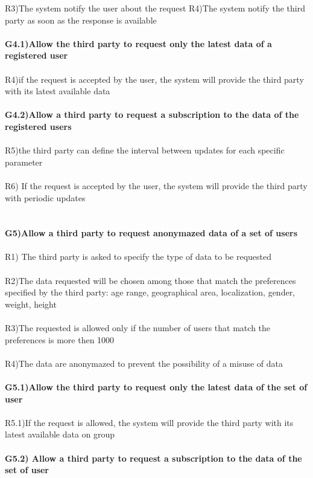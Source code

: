 R3)The system notify the user about the request 
R4)The system notify the third party as soon as the response is available \\ \\
\textbf{G4.1)Allow the third party to request only the latest data of a registered user} \\ \\
R4)if the request is accepted by the user, the system will provide the third party with its latest available data \\ \\ 
\textbf{G4.2)Allow a third party to request a subscription to the data of the registered users} \\ \\
R5)the third party can define the interval between updates for each specific parameter \\ \\
R6) If the request is accepted by the user, the system will provide the third party with periodic updates \\ \\ \\
\textbf{G5)Allow a third party to request anonymazed data of a set of users} \\ \\
R1) The third party is asked to specify the type of data to be requested \\ \\
 R2)The data requested will be chosen among those that match the preferences specified by the third party: age range, geographical area, localization, gender, weight, height \\ \\
R3)The requested is allowed only if the number of users that match the preferences is more then 1000 \\ \\
R4)The data are anonymazed to prevent the possibility of a misuse of data \\ \\ 
\textbf{G5.1)Allow the third party to request only the latest data of the set of user} \\ \\
R5.1)If the request is allowed, the system will provide the third party with its latest available data on group \\ \\
\textbf{G5.2) Allow a third party to request a subscription to the data of the set of user} \\ \\
